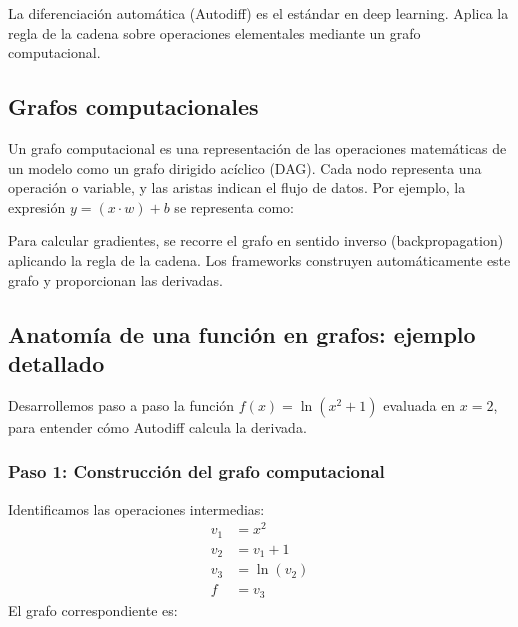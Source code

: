 \documentclass[12pt,a4paper,openany,oneside]{book}
\begin{document}
La diferenciación automática (Autodiff) es el estándar en deep learning. Aplica la regla de la cadena sobre operaciones elementales mediante un grafo computacional.

\subsection{Grafos computacionales}
Un grafo computacional es una representación de las operaciones matemáticas de un modelo como un grafo dirigido acíclico (DAG). Cada nodo representa una operación o variable, y las aristas indican el flujo de datos. Por ejemplo, la expresión $y = (x \cdot w) + b$ se representa como:

\begin{center}
\end{center}

Para calcular gradientes, se recorre el grafo en sentido inverso (backpropagation) aplicando la regla de la cadena. Los frameworks construyen automáticamente este grafo y proporcionan las derivadas.

\subsection{Anatomía de una función en grafos: ejemplo detallado}
Desarrollemos paso a paso la función $f(x) = \ln(x^2 + 1)$ evaluada en $x=2$, para entender cómo Autodiff calcula la derivada.

\subsubsection{Paso 1: Construcción del grafo computacional}
Identificamos las operaciones intermedias:
\begin{align*}
v_1 &= x^2 \\
v_2 &= v_1 + 1 \\
v_3 &= \ln(v_2) \\
f &= v_3
\end{align*}
El grafo correspondiente es:
\end{document}
